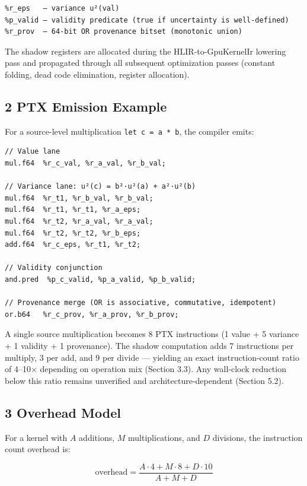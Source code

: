 \documentclass[11pt]{article}
\begin{document}
{{\begin{lstlisting}[basicstyle=\ttfamily\small]
%r_val   — point estimate (the measurand)
%r_eps   — variance u²(val)
%p_valid — validity predicate (true if uncertainty is well-defined)
%r_prov  — 64-bit OR provenance bitset (monotonic union)
\end{lstlisting}

The shadow registers are allocated during the HLIR-to-GpuKernelIr lowering pass and propagated through all subsequent optimization passes (constant folding, dead code elimination, register allocation).

\subsection{2 PTX Emission Example}

For a source-level multiplication \texttt{let c = a * b}, the compiler emits:

\begin{lstlisting}[basicstyle=\ttfamily\small]
// Value lane
mul.f64  %r_c_val, %r_a_val, %r_b_val;

// Variance lane: u²(c) = b²·u²(a) + a²·u²(b)
mul.f64  %r_t1, %r_b_val, %r_b_val;
mul.f64  %r_t1, %r_t1, %r_a_eps;
mul.f64  %r_t2, %r_a_val, %r_a_val;
mul.f64  %r_t2, %r_t2, %r_b_eps;
add.f64  %r_c_eps, %r_t1, %r_t2;

// Validity conjunction
and.pred  %p_c_valid, %p_a_valid, %p_b_valid;

// Provenance merge (OR is associative, commutative, idempotent)
or.b64   %r_c_prov, %r_a_prov, %r_b_prov;
\end{lstlisting}

A single source multiplication becomes 8 PTX instructions (1 value + 5 variance + 1 validity + 1 provenance). The shadow computation adds 7 instructions per multiply, 3 per add, and 9 per divide --- yielding an exact instruction-count ratio of 4–10$\times$ depending on operation mix (Section 3.3). Any wall-clock reduction below this ratio remains unverified and architecture-dependent (Section 5.2).

\subsection{3 Overhead Model}

For a kernel with $A$ additions, $M$ multiplications, and $D$ divisions, the instruction count overhead is:

\[\text{overhead} = \frac{A \cdot 4 + M \cdot 8 + D \cdot 10}{A + M + D}\]

}}
\end{document}
